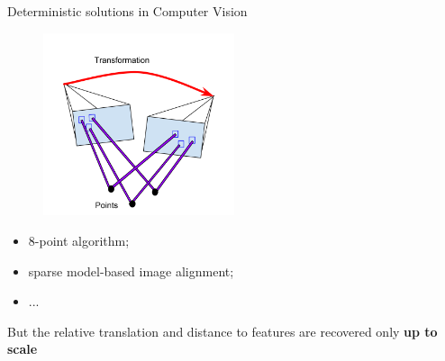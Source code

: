 \documentclass{beamer}
\begin{document}
\begin{frame}{Deterministic solutions in Computer Vision}

\begin{figure}
\centering
\includegraphics[width=0.5\textwidth]{images/directMethod.png}
\end{figure}

\begin{itemize}
\item 8-point algorithm;
\item sparse model-based image alignment;
\item ...
\end{itemize}


But the relative translation and distance to features are recovered only \textbf{up to scale}

\end{frame}
\end{document}
